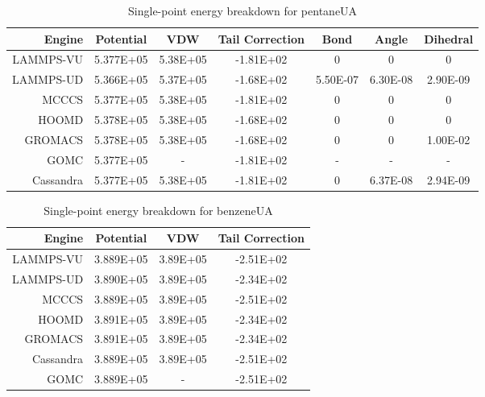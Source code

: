 \begin{table}
\caption{Single-point energy breakdown for pentaneUA}\label{tab:sp_pentane}
\centering
\begin{tabular}{rcccccc}
\hline
Engine & Potential & VDW & Tail Correction & Bond & Angle & Dihedral \\ \hline
LAMMPS-VU & 5.377E+05 & 5.38E+05 & -1.81E+02 & 0 & 0 & 0 \\
LAMMPS-UD & 5.366E+05 & 5.37E+05 & -1.68E+02 & 5.50E-07 & 6.30E-08 & 2.90E-09 \\
MCCCS & 5.377E+05 & 5.38E+05 & -1.81E+02 & 0 & 0 & 0 \\
HOOMD & 5.378E+05 & 5.38E+05 & -1.68E+02 & 0 & 0 & 0 \\
GROMACS & 5.378E+05 & 5.38E+05 & -1.68E+02 & 0 & 0 & 1.00E-02 \\
GOMC & 5.377E+05 & - & -1.81E+02 & - & - & - \\
Cassandra & 5.377E+05 & 5.38E+05 & -1.81E+02 & 0 & 6.37E-08 & 2.94E-09 \\ \hline
\end{tabular}
\end{table}

\begin{table}
\caption{Single-point energy breakdown for benzeneUA}\label{tab:sp_benzene}
\centering
\begin{tabular}{rccc}
\hline
Engine & Potential & VDW & Tail Correction \\ \hline
LAMMPS-VU & 3.889E+05 & 3.89E+05 & -2.51E+02 \\
LAMMPS-UD & 3.890E+05 & 3.89E+05 & -2.34E+02 \\
MCCCS & 3.889E+05 & 3.89E+05 & -2.51E+02 \\
HOOMD & 3.891E+05 & 3.89E+05 & -2.34E+02 \\
GROMACS & 3.891E+05 & 3.89E+05 & -2.34E+02 \\
Cassandra & 3.889E+05 & 3.89E+05 & -2.51E+02 \\
GOMC & 3.889E+05 & - & -2.51E+02 \\ \hline
\end{tabular}
\end{table}

